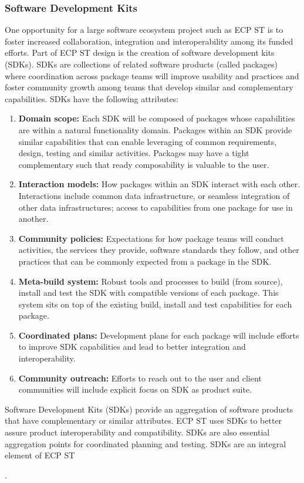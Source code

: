 \subsubsection{Software Development Kits}\label{subsubsect:sdks}
One opportunity for a large software ecosystem project such as ECP ST is to foster increased collaboration, integration and interoperability among its funded efforts. Part of ECP ST design is the creation of software development kits (SDKs).  SDKs are collections of related software products (called packages) where coordination across package teams will improve usability and practices and foster community growth among teams that develop similar and complementary capabilities. SDKs have the following attributes:
\begin{table}
	\begin{mdframed}
\begin{enumerate}
	\item \textbf{Domain scope:} Each SDK will be composed of packages whose capabilities are within a natural functionality domain. Packages within an SDK provide similar capabilities that can enable leveraging of common requirements, design, testing and similar activities. Packages may have a tight complementary such that ready composability is valuable to the user.
	\item \textbf{Interaction models:} How packages within an SDK interact with each other. Interactions include common data infrastructure, or seamless integration of other data infrastructures; access to capabilities from one package for use in another.
	\item \textbf{Community policies:} Expectations for how package teams will conduct activities, the services they provide, software standards they follow, and other practices that can be commonly expected from a package in the SDK.
	\item \textbf{Meta-build system:} Robust tools and processes to build (from source), install and test the SDK with compatible versions of each package. This system sits on top of the existing build, install and test capabilities for each package.
	\item \textbf{Coordinated plans:} Development plans for each package will include efforts to improve SDK capabilities and lead to better integration and interoperability.
	\item \textbf{Community outreach:} Efforts to reach out to the user and client communities will include explicit focus on SDK as product suite.
\end{enumerate}
	\end{mdframed}
\caption{\label{table:sdk-attributes} Software Development Kits (SDKs) provide an aggregation of software products that have complementary or similar attributes.  ECP ST uses SDKs to better assure product interoperability and compatibility.  SDKs are also essential aggregation points for coordinated planning and testing. SDKs are an integral element of ECP ST~\cite{Heroux-SDK-Podcast}}.
\end{table}

